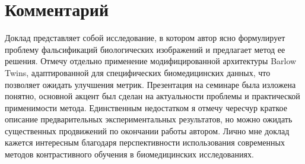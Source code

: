 \documentclass[11pt]{article}
\begin{document}
\section*{Комментарий}
Доклад представляет собой исследование, в котором автор ясно формулирует проблему фальсификаций биологических изображений и 
предлагает метод ее решения. Отмечу отдельно применение модифицированной архитектуры Barlow Twins,
адаптированной для специфических биомедицинских данных, что позволяет ожидать улучшения метрик. Презентация на семинаре
была изложена понятно, основной акцент был сделан на актуальности проблемы и практической применимости метода.
Единственным недостатком я отмечу чересчур краткое описание предварительных экспериментальных результатов,
но можно ожидать существенных продвижений по окончании работы автором. Лично мне доклад кажется интересным
благодаря перспективности использования современных методов контрастивного обучения в биомедицинских исследованиях.
\end{document}
